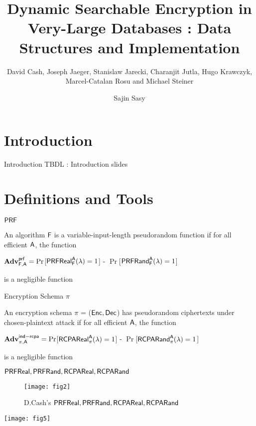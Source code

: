 \documentclass{beamer}
\title{Dynamic Searchable Encryption in Very-Large Databases : Data Structures and Implementation}
\subtitle{David Cash, Joseph Jaeger, Stanislaw Jarecki, Charanjit Jutla, Hugo Krawczyk, Marcel-Catalan Rosu and Michael Steiner}
\author{Sajin Sasy}
\institute{University of Waterloo}
\begin{document}
\maketitle
\section{Introduction}

\begin{frame}{Introduction}
	TBDL : Introduction slides 
\end{frame}

\section{Definitions and Tools}
\begin{frame}{$\mathsf{PRF}$}
\begin{definition}[1] An algorithm $\mathsf{F}$ is a variable-input-length pseudorandom function if for all efficient $\mathsf{A}$, the function
\begin{center}
$\textbf{Adv}^{\mathsf{prf}}_{\mathsf{F},\mathsf{A}} = \Pr$[$\mathsf{PRFReal}^{\mathsf{A}}_{\mathsf{F}}(\lambda)=1$] - $\Pr$[$\mathsf{PRFRand}^{\mathsf{A}}_{\mathsf{F}}(\lambda)=1$]
\end{center}
is a negligible function
\end{definition}
\vfill
\end{frame}

\begin{frame}{Encryption Schema $\pi$}
\begin{definition}[2] An encryption schema $\pi$ = ($\mathsf{Enc},\mathsf{Dec}$) has pseudorandom ciphertexts under chosen-plaintext attack if for all efficient $\mathsf{A}$, the function  
\begin{center}
$\textbf{Adv}^{\mathsf{ind-rcpa}}_{\pi,\mathsf{A}} = \Pr$[$\mathsf{RCPAReal}^{\mathsf{A}}_\pi(\lambda)=1$] - $\Pr$[$\mathsf{RCPARand}^{\mathsf{A}}_\pi(\lambda)=1$]
\end{center}
is a negligible function
\end{definition}
\vfill
\end{frame}

\begin{frame}{$\mathsf{PRFReal},\mathsf{PRFRand},\mathsf{RCPAReal},\mathsf{RCPARand}$}
\begin{figure}[h]
\centering
\texttt{[image: fig2]} \\
\caption{D.Cash's $\mathsf{PRFReal},\mathsf{PRFRand},\mathsf{RCPAReal},\mathsf{RCPARand}$}
\end{figure}
\texttt{[image: fig5]}
\end{frame}
\end{document}
